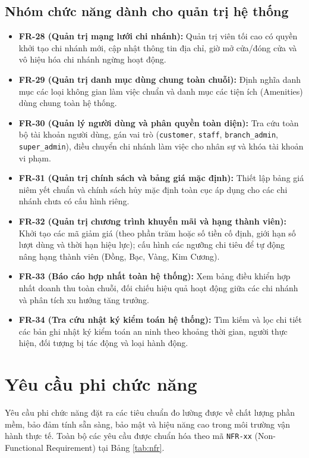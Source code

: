 \subsection{Nhóm chức năng dành cho quản trị hệ thống}
\begin{itemize}
    \item \textbf{FR-28 (Quản trị mạng lưới chi nhánh):} Quản trị viên tối cao có quyền khởi tạo chi nhánh mới, cập nhật thông tin địa chỉ, giờ mở cửa/đóng cửa và vô hiệu hóa chi nhánh ngừng hoạt động.
    \item \textbf{FR-29 (Quản trị danh mục dùng chung toàn chuỗi):} Định nghĩa danh mục các loại không gian làm việc chuẩn và danh mục các tiện ích (Amenities) dùng chung toàn hệ thống.
    \item \textbf{FR-30 (Quản lý người dùng và phân quyền toàn diện):} Tra cứu toàn bộ tài khoản người dùng, gán vai trò (\texttt{customer}, \texttt{staff}, \texttt{branch\_admin}, \texttt{super\_admin}), điều chuyển chi nhánh làm việc cho nhân sự và khóa tài khoản vi phạm.
    \item \textbf{FR-31 (Quản trị chính sách và bảng giá mặc định):} Thiết lập bảng giá niêm yết chuẩn và chính sách hủy mặc định toàn cục áp dụng cho các chi nhánh chưa có cấu hình riêng.
    \item \textbf{FR-32 (Quản trị chương trình khuyến mãi và hạng thành viên):} Khởi tạo các mã giảm giá (theo phần trăm hoặc số tiền cố định, giới hạn số lượt dùng và thời hạn hiệu lực); cấu hình các ngưỡng chi tiêu để tự động nâng hạng thành viên (Đồng, Bạc, Vàng, Kim Cương).
    \item \textbf{FR-33 (Báo cáo hợp nhất toàn hệ thống):} Xem bảng điều khiển hợp nhất doanh thu toàn chuỗi, đối chiếu hiệu quả hoạt động giữa các chi nhánh và phân tích xu hướng tăng trưởng.
    \item \textbf{FR-34 (Tra cứu nhật ký kiểm toán hệ thống):} Tìm kiếm và lọc chi tiết các bản ghi nhật ký kiểm toán an ninh theo khoảng thời gian, người thực hiện, đối tượng bị tác động và loại hành động.
\end{itemize}

\section{Yêu cầu phi chức năng}
\label{sec:yeucau_phichucnang}

Yêu cầu phi chức năng đặt ra các tiêu chuẩn đo lường được về chất lượng phần mềm, bảo đảm tính sẵn sàng, bảo mật và hiệu năng cao trong môi trường vận hành thực tế. Toàn bộ các yêu cầu được chuẩn hóa theo mã \texttt{NFR-xx} (Non-Functional Requirement) tại Bảng \ref{tab:nfr}.

